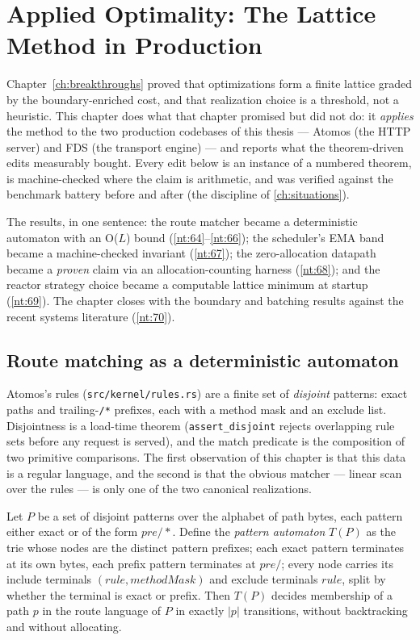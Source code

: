 \chapter{Applied Optimality: The Lattice Method in Production}\label{ch:applied}

Chapter~\ref{ch:breakthroughs} proved that optimizations form a finite
lattice graded by the boundary-enriched cost, and that realization
choice is a threshold, not a heuristic. This chapter does what that
chapter promised but did not do: it \emph{applies} the method to the
two production codebases of this thesis --- Atomos (the HTTP server) and
FDS (the transport engine) --- and reports what the theorem-driven
edits measurably bought. Every edit below is an instance of a numbered
theorem, is machine-checked where the claim is arithmetic, and was
verified against the benchmark battery before and after (the discipline
of \autoref{ch:situations}).

The results, in one sentence: the route matcher became a deterministic
automaton with an O($L$) bound (\autoref{nt:64}--\ref{nt:66}); the
scheduler's EMA band became a machine-checked invariant
(\autoref{nt:67}); the zero-allocation datapath became a \emph{proven}
claim via an allocation-counting harness (\autoref{nt:68}); and the
reactor strategy choice became a computable lattice minimum at startup
(\autoref{nt:69}). The chapter closes with the boundary and batching
results against the recent systems literature (\autoref{nt:70}).

\section{Route matching as a deterministic automaton}\label{sec:route-automaton}

Atomos's rules (\texttt{src/kernel/rules.rs}) are a finite set of
\emph{disjoint} patterns: exact paths and trailing-\texttt{/*} prefixes,
each with a method mask and an exclude list. Disjointness is a load-time
theorem (\texttt{assert\_disjoint} rejects overlapping rule sets before
any request is served), and the match predicate is the composition of
two primitive comparisons. The first observation of this chapter is that
this data is a regular language, and the second is that the obvious
matcher --- linear scan over the rules --- is only one of the two
canonical realizations.

\begin{theorem}\label{nt:64}
Let $P$ be a set of disjoint patterns over the alphabet of path bytes,
each pattern either exact or of the form $\mathit{pre}/\ast$. Define the
\emph{pattern automaton} $T(P)$ as the trie whose nodes are the distinct
pattern prefixes; each exact pattern terminates at its own bytes, each
prefix pattern terminates at $\mathit{pre}/$; every node carries its
include terminals $(rule, methodMask)$ and exclude terminals $rule$,
split by whether the terminal is exact or prefix. Then $T(P)$ decides
membership of a path $p$ in the route language of $P$ in exactly $|p|$
transitions, without backtracking and without allocating.
\end{theorem}


